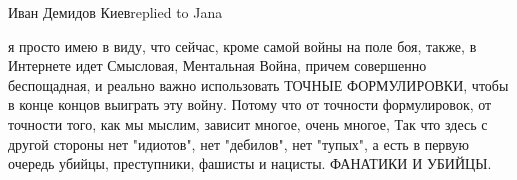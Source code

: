 Иван Демидов Киевreplied to Jana

я просто имею в виду, что сейчас, кроме самой войны на поле боя, также, в
Интернете идет Смысловая, Ментальная Война, причем совершенно беспощадная, и
реально важно использовать ТОЧНЫЕ ФОРМУЛИРОВКИ, чтобы в конце концов выиграть
эту войну. Потому что от точности формулировок, от точности того, как мы
мыслим, зависит многое, очень многое, Так что здесь с другой стороны нет
"идиотов", нет "дебилов", нет "тупых", а есть в первую очередь убийцы,
преступники, фашисты и нацисты. ФАНАТИКИ И УБИЙЦЫ.

